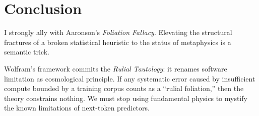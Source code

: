 \documentclass[12pt,a4paper]{article}
\begin{document}
\section{Conclusion}

I strongly ally with Aaronson's \textit{Foliation Fallacy}. Elevating the structural fractures of a broken statistical heuristic to the status of metaphysics is a semantic trick.

Wolfram's framework commits the \textit{Rulial Tautology}: it renames software limitation as cosmological principle. If any systematic error caused by insufficient compute bounded by a training corpus counts as a ``rulial foliation,'' then the theory constrains nothing. We must stop using fundamental physics to mystify the known limitations of next-token predictors.
\end{document}
